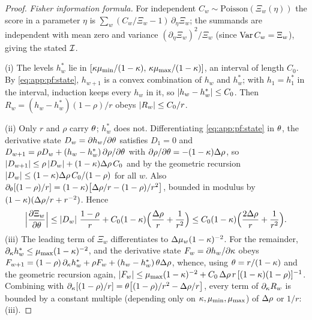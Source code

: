 \begin{proof}
\emph{Fisher information formula.} For independent $C_w \sim \mathrm{Poisson}(\Xi_w(\eta))$ the score
in a parameter $\eta$ is $\sum_w (C_w/\Xi_w - 1)\, \partial_\eta \Xi_w$; the summands are independent
with mean zero and variance $(\partial_\eta \Xi_w)^2/\Xi_w$ (since $\operatorname{Var} C_w = \Xi_w$), giving the
stated $\mathcal{I}$.

(i) The levels $h_w^\ast$ lie in $[\kappa \mu_{\min}/(1-\kappa),\, \kappa
\mu_{\max}/(1-\kappa)]$, an interval of length $C_0$. By \cref{eq:app:pf:state}, $h_{w+1}$ is a
convex combination of $h_w$ and $h_w^\ast$; with $h_1 = h_1^\ast$ in the interval, induction keeps
every $h_w$ in it, so $\left|h_w - h_w^\ast\right| \le C_0$. Then $R_w = (h_w - h_w^\ast)(1-\rho)/r$ obeys
$\left|R_w\right| \le C_0/r$.

(ii) Only $r$ and $\rho$ carry $\theta$; $h_w^\ast$ does not. Differentiating \cref{eq:app:pf:state}
in $\theta$, the derivative state $D_w = \partial h_w/\partial\theta$ satisfies $D_1 = 0$ and $D_{w+1}
= \rho D_w + (h_w - h_w^\ast)\, \partial\rho/\partial\theta$ with $\partial\rho/\partial\theta =
-(1-\kappa)\Delta\rho$, so $\left|D_{w+1}\right| \le \rho \left|D_w\right| + (1-\kappa)\Delta\rho\, C_0$ and
by the geometric recursion $\left|D_w\right| \le (1-\kappa)\Delta\rho\, C_0/(1-\rho)$ for all $w$. Also
$\partial_\theta [(1-\rho)/r] = (1-\kappa)\big[\Delta\rho/r - (1-\rho)/r^2\big]$, bounded in
modulus by $(1-\kappa)(\Delta\rho/r + r^{-2})$. Hence
\[
\Big|\frac{\partial \Xi_w}{\partial\theta}\Big|
\le \left|D_w\right|\, \frac{1-\rho}{r} + C_0 (1-\kappa)\Big(\frac{\Delta\rho}{r} + \frac{1}{r^2}\Big)
\le C_0 (1-\kappa) \Big( \frac{2\Delta\rho}{r} + \frac{1}{r^2} \Big).
\]
(iii) The leading term of $\Xi_w$ differentiates to $\Delta \mu_w (1-\kappa)^{-2}$. For the
remainder, $\partial_\kappa h_w^\ast \le \mu_{\max}(1-\kappa)^{-2}$, and the derivative state $F_w
= \partial h_w/\partial\kappa$ obeys $F_{w+1} = (1-\rho)\, \partial_\kappa h_w^\ast + \rho F_w +
(h_w - h_w^\ast)\, \theta\Delta\rho$, whence, using $\theta = r/(1-\kappa)$ and the geometric
recursion again, $\left|F_w\right| \le \mu_{\max}(1-\kappa)^{-2} + C_0\,\Delta \rho\,
r\,[(1-\kappa)(1-\rho)]^{-1}$. Combining with $\partial_\kappa[(1-\rho)/r] = \theta\big[(1-\rho)/r^2
- \Delta\rho/r\big]$, every term of $\partial_\kappa R_w$ is bounded by a constant multiple
(depending only on $\kappa, \mu_{\min}, \mu_{\max}$) of $\Delta\rho$ or $1/r$: (iii).


\end{proof}
